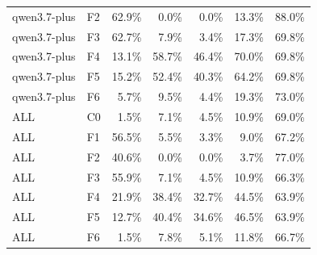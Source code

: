 \begin{tabular}{llrrrrr}
qwen3.7-plus & F2 & 62.9\% & 0.0\% & 0.0\% & 13.3\% & 88.0\% \\
qwen3.7-plus & F3 & 62.7\% & 7.9\% & 3.4\% & 17.3\% & 69.8\% \\
qwen3.7-plus & F4 & 13.1\% & 58.7\% & 46.4\% & 70.0\% & 69.8\% \\
qwen3.7-plus & F5 & 15.2\% & 52.4\% & 40.3\% & 64.2\% & 69.8\% \\
qwen3.7-plus & F6 & 5.7\% & 9.5\% & 4.4\% & 19.3\% & 73.0\% \\
ALL & C0 & 1.5\% & 7.1\% & 4.5\% & 10.9\% & 69.0\% \\
ALL & F1 & 56.5\% & 5.5\% & 3.3\% & 9.0\% & 67.2\% \\
ALL & F2 & 40.6\% & 0.0\% & 0.0\% & 3.7\% & 77.0\% \\
ALL & F3 & 55.9\% & 7.1\% & 4.5\% & 10.9\% & 66.3\% \\
ALL & F4 & 21.9\% & 38.4\% & 32.7\% & 44.5\% & 63.9\% \\
ALL & F5 & 12.7\% & 40.4\% & 34.6\% & 46.5\% & 63.9\% \\
ALL & F6 & 1.5\% & 7.8\% & 5.1\% & 11.8\% & 66.7\% \\
\bottomrule
\end{tabular}
